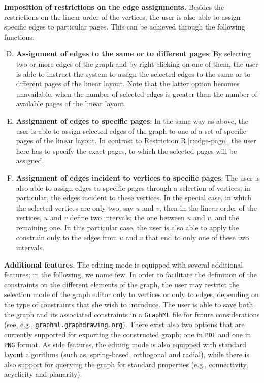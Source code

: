 \documentclass[runningheads]{llncs}
\newcommand{\myparagraph}[1]{\medskip\noindent\textbf{#1}.}
\newcommand\rurl[1]{\href{http://#1}{\nolinkurl{#1}}}
\begin{document}
%
\noindent\textbf{Imposition of restrictions on the edge assignments.} Besides the restrictions on the linear order of the vertices, the user is also able to assign specific edges to particular pages. This can be achieved through the following functions.
%
\begin{enumerate}[R.1]
\setcounter{enumi}{3}
\item \label{r:edge-page} \textbf{Assignment of edges to the same or to different pages}: By selecting two or more edges of the graph and by right-clicking on one of them, the user is able to instruct the system to assign the selected edges to the same or to different pages of the linear layout. Note that the latter option becomes unavailable, when the number of selected edges is greater than the number of available pages of the linear layout. 
\item \label{r:same-page} \textbf{Assignment of edges to specific pages}: In the same way as above, the user is able to assign selected edges of the graph to one of a set of specific pages of the linear layout. In contrast to Restriction R.\ref{r:edge-page}, the user here has to specify the exact pages, to which the selected pages will be assigned. 
\item \label{r:incident} \textbf{Assignment of edges incident to vertices to specific pages}: The user is also able to assign edges to specific pages through a selection of vertices; in particular, the edges incident to these vertices. 
In the special case, in which the selected vertices are only two, say $u$ and $v$, then in the linear order of the vertices, $u$ and $v$ define two intervals; the one between $u$ and $v$, and the remaining one. In this particular case, the user is also able to apply the constrain only to the edges from $u$ and $v$ that end to only one of these two intervals. 
\end{enumerate}
%
\myparagraph{Additional features} The editing mode is equipped with several additional features; in the following, we name few. In order to facilitate the definition of the constraints on the different elements of the graph, the user may restrict the selection mode of the graph editor only to vertices or only to edges, depending on the type of constraints that she wish to introduce. The user is able to save both the graph and its associated constraints in a \texttt{GraphML} file for future considerations (see, e.g., \rurl{graphml.graphdrawing.org}). There exist also two options that are currently supported for exporting the constructed graph; one in \texttt{PDF} and one in \texttt{PNG} format. As side features, the editing mode is also equipped with standard layout algorithms (such as, spring-based, orthogonal and radial), while there is also support for querying the graph for standard properties (e.g., connectivity, acyclicity and planarity). 
\end{document}
